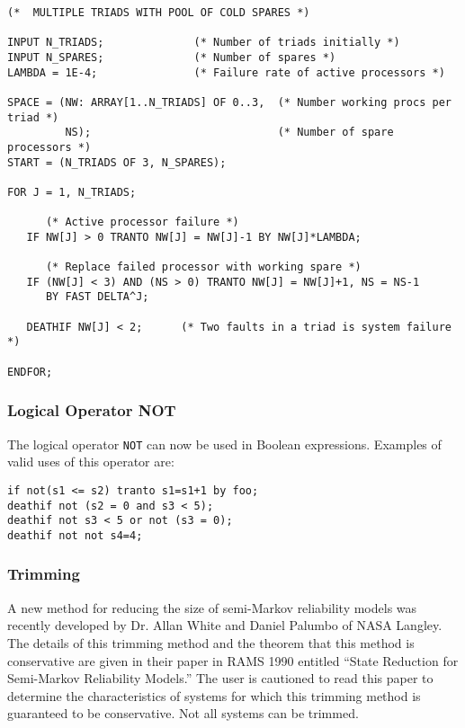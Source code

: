  \begin{verbatim}
(*  MULTIPLE TRIADS WITH POOL OF COLD SPARES *)
 
INPUT N_TRIADS;              (* Number of triads initially *)
INPUT N_SPARES;              (* Number of spares *)
LAMBDA = 1E-4;               (* Failure rate of active processors *)
 
SPACE = (NW: ARRAY[1..N_TRIADS] OF 0..3,  (* Number working procs per triad *)
         NS);                             (* Number of spare processors *)
START = (N_TRIADS OF 3, N_SPARES);
 
FOR J = 1, N_TRIADS;

      (* Active processor failure *)
   IF NW[J] > 0 TRANTO NW[J] = NW[J]-1 BY NW[J]*LAMBDA;

      (* Replace failed processor with working spare *)
   IF (NW[J] < 3) AND (NS > 0) TRANTO NW[J] = NW[J]+1, NS = NS-1 
      BY FAST DELTA^J;
 
   DEATHIF NW[J] < 2;      (* Two faults in a triad is system failure *)
 
ENDFOR;
\end{verbatim}

\subsubsection{Logical Operator NOT}

     The logical operator \verb'NOT' can now be used in Boolean expressions.
Examples of valid uses of this operator are:
\begin{verbatim}
if not(s1 <= s2) tranto s1=s1+1 by foo;
deathif not (s2 = 0 and s3 < 5);
deathif not s3 < 5 or not (s3 = 0);
deathif not not s4=4;
\end{verbatim}
 
\subsubsection{Trimming}

     A new method for reducing the size of semi-Markov reliability models
was recently developed by Dr. Allan White and Daniel Palumbo of NASA Langley.
The details of this trimming method and the theorem that this method is
conservative are given in their paper in RAMS 1990 entitled ``State
Reduction for Semi-Markov Reliability Models.''  The user is cautioned
to read this paper to determine the characteristics of systems for which
this trimming method is guaranteed to be conservative.  Not all systems can
be trimmed.

